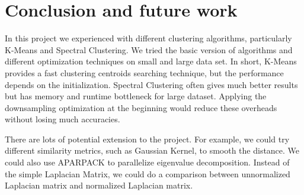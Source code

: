 \documentclass{acm_proc_article-sp}
\begin{document}
\section{Conclusion and future work}

In this project we experienced with different clustering algorithms, particularly K-Means and Spectral Clustering. We tried the basic version of algorithms and different optimization techniques on small and large data set. In short, K-Means provides a fast clustering centroids searching technique, but the performance depends on the initialization. Spectral Clustering often gives much better results but has memory and runtime bottleneck for large dataset. Applying the downsampling optimization at the beginning would reduce these overheads without losing much accuracies.  

There are lots of potential extension to the project. For example, we could try different similarity metrics, such as Gaussian Kernel, to smooth the distance. We could also use APARPACK to parallelize eigenvalue decomposition. Instead of the simple Laplacian Matrix, we could do a comparison  between unnormalized Laplacian matrix and normalized Laplacian matrix.

%
%

\balancecolumns
\end{document}

